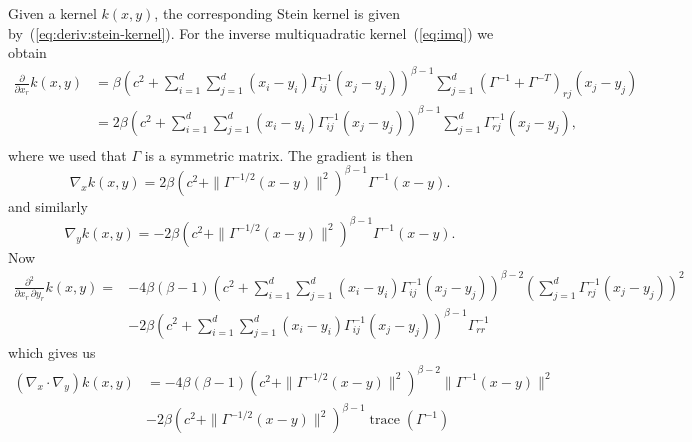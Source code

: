 \documentclass[11pt,a4paper]{report}
\DeclareMathOperator{\trace}{trace}
\begin{document}
Given a kernel $k(x,y)$, the corresponding Stein kernel is given by~(\ref{eq:deriv:stein-kernel}). For the inverse multiquadratic kernel~(\ref{eq:imq}) we obtain
\begin{equation}
\begin{aligned}
\frac{\partial}{\partial x_r} k(x,y) 
&= \beta \left(c^2 + \sum_{i=1}^d\sum_{j=1}^d (x_i-y_i) \Gamma^{-1}_{ij}(x_j-y_j)\right)^{\beta-1}
\sum_{j=1}^d (\Gamma^{-1} + \Gamma^{-T})_{rj}(x_j - y_j) \\
&= 2 \beta \left(c^2 + \sum_{i=1}^d\sum_{j=1}^d (x_i-y_i) \Gamma^{-1}_{ij}(x_j-y_j)\right)^{\beta-1}
\sum_{j=1}^d \Gamma^{-1}_{rj}(x_j - y_j), \\
\end{aligned}
\end{equation}
where we used that $\Gamma$ is a symmetric matrix. The gradient is then
\begin{equation}
\nabla_x k(x,y) = 2 \beta \left(c^2 + \| \Gamma^{-1/2} (x-y)\|^2\right)^{\beta-1} \Gamma^{-1} (x - y).
\label{eq:appx:deviv:nablax}
\end{equation}
and similarly
\begin{equation}
\nabla_y k(x,y) = -2 \beta \left(c^2 + \| \Gamma^{-1/2} (x-y)\|^2\right)^{\beta-1} \Gamma^{-1} (x - y).
\label{eq:appx:deviv:nablay}
\end{equation}
Now
\begin{equation}
\begin{aligned}
\frac{\partial^2}{\partial x_r\,\partial y_r} k(x,y) 
= &-4 \beta(\beta-1) \left(c^2 + \sum_{i=1}^d\sum_{j=1}^d (x_i-y_i) \Gamma^{-1}_{ij}(x_j-y_j)\right)^{\beta-2} \left(\sum_{j=1}^d \Gamma^{-1}_{rj}(x_j - y_j)\right)^2 \\
&- 2\beta \left(c^2 + \sum_{i=1}^d\sum_{j=1}^d (x_i-y_i) \Gamma^{-1}_{ij}(x_j-y_j)\right)^{\beta-1} \Gamma^{-1}_{rr}
\end{aligned}
\end{equation}
which gives us
\begin{equation}
\begin{aligned}
(\nabla_x \cdot \nabla_y) k(x,y) 
&= -4 \beta(\beta-1) \left(c^2 + \| \Gamma^{-1/2}(x-y)\|^2\right)^{\beta-2} \| \Gamma^{-1}(x - y)\|^2 \\
&- 2\beta \left(c^2 + \|\Gamma^{-1/2}(x-y)\|^2\right)^{\beta-1} \trace(\Gamma^{-1})
\label{eq:appx:deriv:nablax_nablay}
\end{aligned}
\end{equation}
\end{document}
